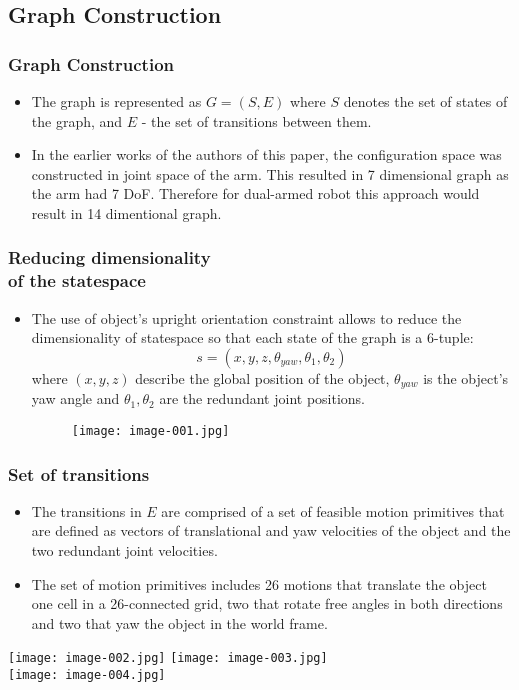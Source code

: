 \documentclass{beamer}
\begin{document}
\subsection{Graph Construction}
\begin{frame}
\frametitle{Graph Construction}
\begin{itemize}
  \item The graph is represented as $G=(S,E)$ where $S$ denotes the set of
  states of the graph, and $E$ - the set of transitions between them.
  \item In the earlier works of the authors of this paper, the configuration
  space was constructed in joint space of the arm. This resulted in 7
  dimensional graph as the arm had 7 DoF. Therefore for dual-armed robot this
  approach would result in 14 dimentional graph.
\end{itemize}
\end{frame}
 
\begin{frame}
\frametitle{Reducing dimensionality\\ of the statespace}
\begin{itemize}
  \item The use of object's upright orientation constraint allows to reduce the
  dimensionality of statespace so that each state of the graph is a 6-tuple:
  $$
  s=(x,y,z,\theta_{yaw},\theta_1,\theta_2)
  $$
  where $(x,y,z)$ describe the global position of the object,
  $\theta_{yaw}$ is the object's yaw angle and $\theta_1, \theta_2$ are
  the redundant joint positions.
\begin{figure}[]
\centering
\texttt{[image: image-001.jpg]}
\label{fig:6-tuple}
\end{figure}
\end{itemize}
\end{frame}


\begin{frame}
\frametitle{Set of transitions}
\begin{itemize}
  \item The transitions in $E$ are comprised of a set of feasible motion
  primitives that are defined as vectors of translational and yaw velocities of the object and the two redundant joint velocities.
  \item The set of motion primitives includes 26 motions that translate the
  object one cell in a 26-connected grid, two that rotate free angles in both directions and two that yaw the object in the world frame.

\end{itemize}
\begin{center}
\texttt{[image: image-002.jpg]}
\texttt{[image: image-003.jpg]}\\
\texttt{[image: image-004.jpg]}
\end{center}
\end{frame}
\end{document}
